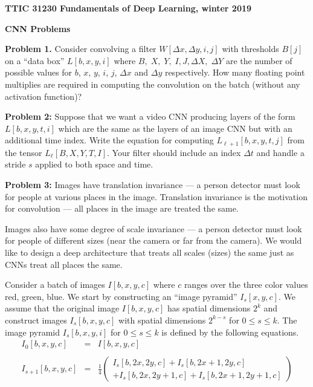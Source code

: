 \documentclass{article}
\newcommand{\solution}[1]{\bigskip {\color{red} {\bf Solution}: #1}}
\begin{document}
\centerline{\bf TTIC 31230 Fundamentals of Deep Learning, winter 2019}

\medskip
\centerline{\bf CNN Problems}

\bigskip
{\bf Problem 1.}  Consider convolving a filter $W[\Delta x, \Delta y, i,j]$  with thresholds $B[j]$ on a ``data box'' $L[b,x,y,i]$ where $B,\;X,\;Y,\;I, J,\Delta X,\;\Delta Y$
are the number of possible values for $b$, $x$, $y$, $i$, $j$, $\Delta x$ and $\Delta y$ respectively.
How many floating point multiplies are required
in computing the convolution on the batch (without any activation function)?

\solution{$$BXY\;\Delta X\;\Delta Y \;IJ$$}

\bigskip
{\bf Problem 2:} Suppose that we want a video CNN producing layers of the form $L[b,x,y,t,i]$ which are the same as the layers of an image CNN but with an additional time index.
Write the equation for computing $L_{\ell+1}[b,x,y,t,j]$ from the tensor $L_\ell[B,X,Y,T,I]$.  Your filter should include an index $\Delta t$ and handle a stride $s$ applied
to both space and time.

\solution{
  $$L_{\ell + 1}[b,x,y,t,j] = \sum_{\Delta x, \Delta y, \Delta t, i} W[\Delta x, \Delta y, \Delta t, i, j] L_\ell[b, sx+ \Delta x, sy + \Delta y, st + \Delta t, i]$$
  }

\bigskip
{\bf Problem 3:} Images have translation invariance --- a person detector must look for people at various places in the image.  Translation invariance is the motivation for
convolution --- all places in the image are treated the same.

\medskip
Images also have some degree of scale invariance --- a person detector must look for people of different sizes
(near the camera or far from the camera).  We would like to design a deep architecture that treats all scales (sizes) the same just as CNNs
treat all places the same.

\medskip
Consider a batch of images
$I[b,x,y,c]$ where $c$ ranges over the three color values red, green, blue. We start by constructing an ``image pyramid'' $I_s[x,y,c]$.
We assume that the original image $I[b,x,y,c]$ has spatial dimensions $2^k$ and construct images $I_s[b,x,y,c]$ with spatial dimensions $2^{k-s}$
for $0 \leq s \leq k$.  The image pyramid $I_s[b,x,y,i]$ for $0 \leq s \leq k$ is defined by the following equations.
\begin{eqnarray*}
  I_0[b,x,y,c] & = & I[b,x,y,c] \\
  \\
  I_{s+1}[b,x,y,c] & = & \frac{1}{4}\left(\begin{array}{l} I_s[b,2x,2y,c] + I_s[b,2x+1,2y,c] \\ + I_s[b,2x,2y+1,c] + I_s[b,2x+1,2y+1,c]\end{array}\right)
\end{eqnarray*}
\end{document}
